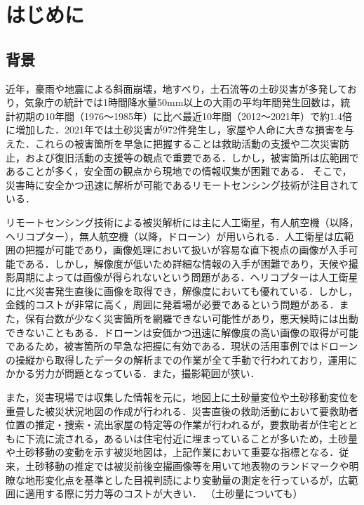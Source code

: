 \chapter{はじめに}
  \section{背景}
    近年，豪雨や地震による斜面崩壊，地すべり，土石流等の土砂災害が多発しており，気象庁の統計では1時間降水量50mm以上の大雨の平均年間発生回数は，統計初期の10年間（1976〜1985年）に比べ最近10年間（2012〜2021年）で約1.4倍に増加した\cite{背景1}．2021年では土砂災害が972件発生し，家屋や人命に大きな損害を与えた\cite{背景2}．これらの被害箇所を早急に把握することは救助活動の支援や二次災害防止，および復旧活動の支援等の観点で重要である\cite{}．しかし，被害箇所は広範囲であることが多く，安全面の観点から現地での情報収集が困難である．
    そこで，災害時に安全かつ迅速に解析が可能であるリモートセンシング技術が注目されている\cite{}．

    リモートセンシング技術による被災解析には主に人工衛星，有人航空機（以降，ヘリコプター），無人航空機（以降，ドローン）が用いられる．人工衛星は広範囲の把握が可能であり，画像処理において扱いが容易な直下視点の画像が入手可能である．しかし，解像度が低いため詳細な情報の入手が困難であり，天候や撮影周期によっては画像が得られないという問題がある．ヘリコプターは人工衛星に比べ災害発生直後に画像を取得でき，解像度においても優れている．しかし，金銭的コストが非常に高く，周囲に発着場が必要であるという問題がある．また，保有台数が少なく災害箇所を網羅できない可能性があり，悪天候時には出動できないこともある．ドローンは安価かつ迅速に解像度の高い画像の取得が可能であるため，被害箇所の早急な把握に有効である．現状の活用事例ではドローンの操縦から取得したデータの解析までの作業が全て手動で行われており，運用にかかる労力が問題となっている．また，撮影範囲が狭い．

    また，災害現場では収集した情報を元に，地図上に土砂量変位や土砂移動変位を重畳した被災状況地図の作成が行われる．災害直後の救助活動において要救助者位置の推定・捜索・流出家屋の特定等の作業が行われるが，要救助者が住宅とともに下流に流される，あるいは住宅付近に埋まっていることが多いため，土砂量や土砂移動の変動を示す被災地図は，上記作業において重要な指標となる．従来，土砂移動の推定では被災前後空撮画像等を用いて地表物のランドマークや明瞭な地形変化点を基準とした目視判読により変動量の測定を行っているが\cite{先行研究1}，広範囲に適用する際に労力等のコストが大きい．
    （土砂量についても）

